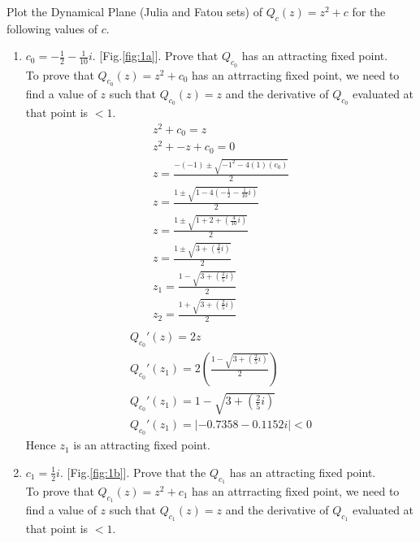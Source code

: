 \documentclass[11pt]{article}
\begin{document}
    Plot the Dynamical Plane (Julia and Fatou sets) of $Q_c(z) = z^2+c$ for the following values of $c$.
\begin{enumerate}[label=(\alph{*})]
    \item $c_0 = -\frac{1}{2} - \frac{1}{10}i$. [Fig.\ref{fig:1a}]. Prove that $Q_{c_0}$ has an attracting fixed point.\\
    To prove that $Q_{c_0}(z)=z^2+c_0$ has an attrracting fixed point, we need to find a value of $z$ such that $Q_{c_0}(z) = z$ and the derivative of $Q_{c_0}$ evaluated at that point is $< 1$.
    \begin{equation}
        \begin{split}
        z^2 + c_0 = z \\
        z^2 + -z + c_0 = 0 \\
        z=\frac{-\left(-1\right)\pm\sqrt{-1^2-4\left(1\right)\left(c_0\right)}}{2}\\
        z=\frac{1\pm\sqrt{1-4\left(-\frac{1}{2} - \frac{1}{10}i\right)}}{2}\\
        z=\frac{1\pm\sqrt{1+2+\left(\frac{4}{10}i\right)}}{2}\\
        z=\frac{1\pm\sqrt{3+\left(\frac{2}{5}i\right)}}{2}\\
        z_1=\frac{1-\sqrt{3+\left(\frac{2}{5}i\right)}}{2}\\
        z_2=\frac{1+\sqrt{3+\left(\frac{2}{5}i\right)}}{2}\\
        \end{split}
    \end{equation}
    \begin{equation}
        \begin{split}
            Q_{c_0}'(z) = 2z\\
            Q_{c_0}'(z_1) = 2 \left(\frac{1-\sqrt{3+\left(\frac{2}{5}i\right)}}{2}\right)\\
            Q_{c_0}'(z_1) = 1-\sqrt{3+\left(\frac{2}{5}i\right)}\\
            Q_{c_0}'(z_1) = |-0.7358 - 0.1152 i| < 0
        \end{split}
    \end{equation}
    Hence $z_1$ is an attracting fixed point.
    \item $c_1 = \frac{1}{2}i$. [Fig.\ref{fig:1b}]. Prove that the $Q_{c_1}$ has an attracting fixed point.\\
    To prove that $Q_{c_1}(z)=z^2+c_1$ has an attrracting fixed point, we need to find a value of $z$ such that $Q_{c_1}(z) = z$ and the derivative of $Q_{c_1}$ evaluated at that point is $< 1$.

\end{enumerate}
\end{document}
